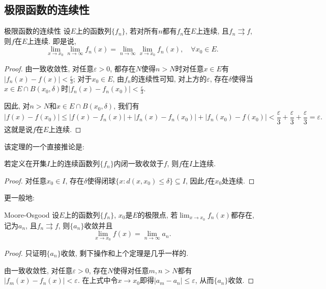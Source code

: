 \subsection{极限函数的连续性}

\begin{theorem}{极限函数的连续性} \label{jixmhjuudelmxuxk}
	设$E$上的函数列$\{ f_n \}$, 若对所有$n$都有$f_n$在$E$上连续, 且$f_n \rightrightarrows f$, 则$f$在$E$上连续. 即是说, $$\lim_{x \to x_0} \lim_{n \to \infty} f_n(x) = \lim_{n\to \infty} \lim_{x \to x_0} f_n(x) , \quad \forall x_0 \in E. $$
\end{theorem}
\begin{proof}
	由一致收敛性, 对任意$\varepsilon >0$, 都存在$N$使得$n>N$时对任意$x \in E$有$|f_n(x)-f(x)|<\frac{\varepsilon}{3}$; 对于$x_0 \in E$, 由$f_n$的连续性可知, 对上方的$\varepsilon$, 存在$\delta$使得当$x \in E \cap B(x_0,\delta)$时$|f_n(x)-f_n(x_0)|<\frac{\varepsilon}{3}$. 
	
	因此, 对$n>N$和$x \in E \cap B(x_0,\delta)$, 我们有$$|f(x)-f(x_0)| \leq |f(x)-f_n(x)|+|f_n(x)-f_n(x_0)| + |f_n(x_0)-f(x_0)| < \frac{\varepsilon}{3} + \frac{\varepsilon}{3} + \frac{\varepsilon}{3} = \varepsilon .$$
	这就是说$f$在$E$上连续. 
\end{proof}

该定理的一个直接推论是: 

\begin{corollary}{}
	若定义在开集$I$上的连续函数列$\{ f_n \}$内闭一致收敛于$f$, 则$f$在$I$上连续. 
\end{corollary}
\begin{proof}
	对任意$x_0 \in I$, 存在$\delta$使得闭球$\{ x:d(x,x_0)\leq \delta \} \subseteq I$, 因此$f$在$x_0$处连续. 
\end{proof}

更一般地: 

\begin{theorem}{Moore-Osgood}
	设$E$上的函数列$\{ f_n \}$, $x_0$是$E$的极限点, 若$\lim_{x \to x_0} f_n(x)$都存在, 记为$a_n$, 且$f_n \rightrightarrows f$, 则$\{ a_n \}$收敛并且$$\lim_{x \to x_0} f(x) = \lim_{n \to \infty} a_n.$$
\end{theorem}
\begin{proof}
	只证明$\{ a_n \}$收敛, 剩下操作和上个定理是几乎一样的. 
	
	由一致收敛性, 对任意$\varepsilon >0$, 存在$N$使得对任意$m,n >N$都有$|f_m(x)-f_n(x)|<\varepsilon$. 在上式中令$x \to x_0$即得$|a_m-a_n|\leq \varepsilon$, 从而$\{ a_n \}$收敛. 
\end{proof}


